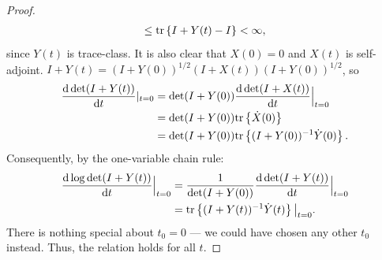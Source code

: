 \documentclass{amsart}
\numberwithin{equation}{section}
\providecommand{\DIFaddend}{} %
\begin{document}
\begin{proof}
\begin{align*}
    \leq \textup{tr}\left \{I+Y(t) - I \right \}< \infty,
  \end{align*}
  since $Y(t)$ is trace-class. It is also clear that
  $X(0) = 0$ and $X(t)$ is self-adjoint.
  $I+Y(t) = (I+Y(0))^{1/2}(I+X(t))(I+Y(0))^{1/2}$, so
  \begin{align*}
    \frac{\text{\textup{d}} \det (I+Y(t))}{\text{\textup{d}} t}|_{t=0} 
    &= \det (I+Y(0))\frac{\text{\textup{d}} \det (I+X(t))}{\text{\textup{d}} t}\Big |_{t=0} \\
    &= \det (I+Y(0)) \textup{tr}\left \{\dot{X}(0) \right \} \\
    &= \det (I+Y(0)) \textup{tr}\left \{(I+Y(0))^{-1} \dot{Y}(0) \right \}.
  \end{align*}
  Consequently, by the one-variable chain rule:
  \begin{align*}
    \frac{\text{\textup{d}} \log \det (I+Y(t))}{\text{\textup{d}} t}\Big |_{t=0} &=
    \frac{1}{\det (I+Y(0))}\frac{\text{\textup{d}} \det (I+Y(t))}{\text{\textup{d}} t}\Big |_{t=0} \\ 
    &= \textup{tr}\left \{ (I+Y(t))^{-1} \dot{Y}(t) \right \} \big |_{t=0}.
  \end{align*}
  There is nothing special about $t_0 = 0$ --- we could have chosen
  any other $t_0$ instead. Thus, the relation holds for all $t$.
\end{proof}
\DIFaddend 
\end{document}
